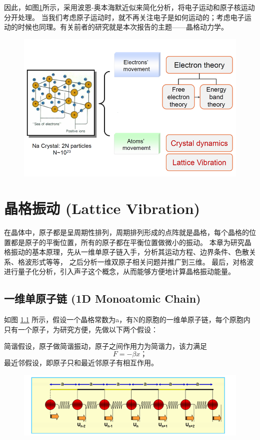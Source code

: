 \documentclass[declarePage]{ecnuthesis}
\begin{document}
因此，如图\ref{BOA}所示，采用波恩-奥本海默近似来简化分析，将电子运动和原子核运动分开处理。%
当我们考虑原子运动时，就不再关注电子是如何运动的；考虑电子运动的时候也同理。有关前者的研究就是本次报告的主题——晶格动力学。
\begin{figure}[htb]
    \centering
    \includegraphics[width=.7\textwidth]{BOA.png}
    \label{BOA}
\end{figure}

\chapter{晶格振动 (Lattice Vibration)}

在晶体中，原子都是呈周期性排列，周期排列形成的点阵就是晶格，每个晶格的位置都是原子的平衡位置，所有的原子都在平衡位置做微小的振动。%
本章为研究晶格振动的基本原理，先从一维单原子链入手，分析其运动方程、边界条件、色散关系、格波形式等等，%
之后分析一维双原子相关问题并推广到三维。%
最后，对格波进行量子化分析，引入声子这个概念，从而能够方便地计算晶格振动能量。

\section{一维单原子链 (1D Monoatomic Chain)}

如图 \ref{1DMC} 所示，假设一个晶格常数为a，有N的原胞的一维单原子链，每个原胞内只有一个原子，为研究方便，先做以下两个假设：

简谐假设，原子做简谐振动，原子之间作用力为简谐力，该力满足
\begin{equation}
    F = - \beta x \text{；}
\end{equation}
最近邻假设，即原子只和最近邻原子有相互作用。
\begin{figure}[htb]
    \centering
    \includegraphics[width=.7\textwidth]{1DMC.png}
    \label{1DMC}
\end{figure}
\end{document}
